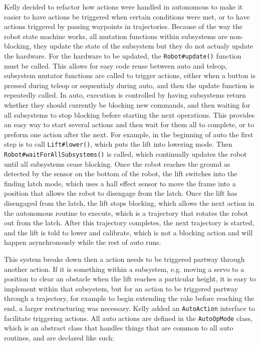 \documentclass{article}
\begin{document}
Kelly decided to refactor how actions were handled in autonomous to make it easier to have actions be triggered when certain conditions were met, or to have actions triggered by passing waypoints in trajectories. Because of the way the robot state machine works, all mutation functions within subsystems are non-blocking, they update the state of the subsystem but they do not actualy update the hardware. For the hardware to be updated, the \texttt{Robot\#update()} function must be called. This allows for easy code reuse between auto and teleop, subsystem mutator functions are called to trigger actions, either when a button is pressed during teleop or sequentialy during auto, and then the update function is repeatedly called. In auto, execution is controlled by having subsystems return whether they should currently be blocking new commands, and then waiting for all subsystems to stop blocking before starting the next operations. This provides an easy way to start several actions and then wait for them all to complete, or to preform one action after the next. For example, in the beginning of auto the first step is to call \texttt{Lift\#lower()}, which puts the lift into lowering mode. Then \texttt{Robot\#waitForAllSubsystems()} is called, which continually updates the robot until all subsystems cease blocking. Once the robot reaches the ground as detected by the sensor on the bottom of the robot, the lift switches into the finding latch mode, which uses a hall effect sensor to move the frame into a position that allows the robot to disengage from the latch. Once the lift has disengaged from the latch, the lift stops blocking, which allows the next action in the autonomous routine to execute, which is a trajectory that rotates the robot out from the latch. After this trajectory completes, the next trajectory is started, and the lift is told to lower and calibrate, which is not a blocking action and will happen asynchronously while the rest of auto runs. 

This system breaks down then a action needs to be triggered partway through another action. If it is something within a subsystem, e.g. moving a servo to a position to clear an obstacle when the lift reaches a particular height, it is easy to implement within that subsystem, but for an action to be triggered partway through a trajectory, for example to begin extending the rake before reaching the end, a larger restructuring was necessary. Kelly added an \texttt{AutoAction} interface to facilitate triggering actions. All auto actions are defined in the \texttt{AutoOpMode} class, which is an abstract class that handles things that are common to all auto routines, and are declared like such:
\end{document}
